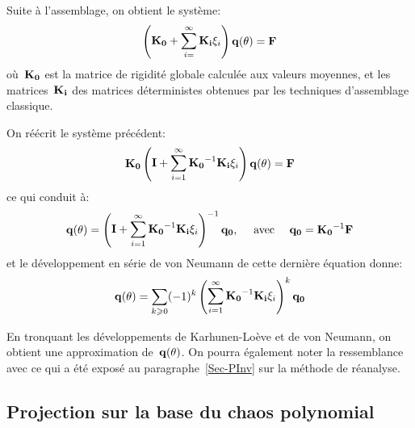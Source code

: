 Suite à l'assemblage, on obtient le système:
\begin{equation}\label{Eq-StoKLEx}
\PP{\MM{K_0}+\dsum_{i=}^\infty\MM{K_i}\xi_i}\VV{q(\theta)}=\VV{F}
\end{equation}
où~$\MM{K_0}$ est la matrice de rigidité globale calculée aux valeurs moyennes, et les matrices~$\MM{K_i}$ des matrices déterministes obtenues par les techniques d'assemblage classique.

On réécrit le système précédent:
\begin{equation}
\MM{K_0}\PP{\MM{I}+\dsum_{i=1}^\infty\MMI{K_0}\MM{K_i}\xi_i}\VV{q(\theta)}=\VV{F}
\end{equation}
ce qui conduit à:
\begin{equation}
\VV{q(\theta)} = \PP{\MM{I}+\dsum_{i=1}^\infty\MMI{K_0}\MM{K_i}\xi_i}^{-1}\VV{q_0}, \quad \text{ avec } \quad \VV{q_0}=\MMI{K_0}\VV{F}
\end{equation}
et le développement en série de von Neumann de cette dernière équation donne:
\begin{equation}\label{Eq-StoQ}
\VV{q(\theta)} = \dsum_{k\ge0} (-1)^k \PP{\dsum_{i=1}^\infty\MMI{K_0}\MM{K_i}\xi_i}^k\VV{q_0}
\end{equation}

En tronquant les développements de Karhunen-Loève et de von Neumann, on obtient une approximation de~$\VV{q(\theta)}$. On pourra également noter la ressemblance avec ce qui a été exposé au paragraphe~\ref{Sec-PInv} sur la méthode de réanalyse.

\medskip
\subsection{Projection sur la base du chaos polynomial}

